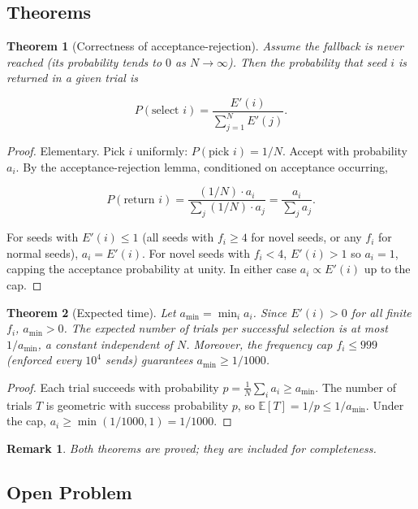 \documentclass[11pt,a4paper]{article}
\newtheorem{theorem}{Theorem}
\newtheorem{remark}{Remark}
\begin{document}
\subsection{Theorems}

\begin{theorem}[Correctness of acceptance-rejection]
\label{thm:ifps-correct}
Assume the fallback is never reached (its probability tends to $0$ as
$N \to \infty$).  Then the probability that seed $i$ is returned in a
given trial is

\[
P(\text{select } i) = \frac{E'(i)}{\sum_{j=1}^N E'(j)}.
\]
\end{theorem}

\begin{proof}
Elementary.  Pick $i$ uniformly: $P(\text{pick } i) = 1/N$.  Accept with
probability $a_i$.  By the acceptance-rejection lemma, conditioned on
acceptance occurring,

\[
P(\text{return } i) = \frac{(1/N) \cdot a_i}{\sum_j (1/N) \cdot a_j}
= \frac{a_i}{\sum_j a_j}.
\]

For seeds with $E'(i) \le 1$ (all seeds with $f_i \ge 4$ for novel
seeds, or any $f_i$ for normal seeds), $a_i = E'(i)$.  For novel seeds
with $f_i < 4$, $E'(i) > 1$ so $a_i = 1$, capping the acceptance
probability at unity.  In either case $a_i \propto E'(i)$ up to the cap.
\end{proof}

\begin{theorem}[Expected time]
\label{thm:ifps-time}
Let $a_{\min} = \min_i a_i$.  Since $E'(i) > 0$ for all finite $f_i$,
$a_{\min} > 0$.  The expected number of trials per successful selection
is at most $1 / a_{\min}$, a constant independent of $N$.  Moreover, the
frequency cap $f_i \le 999$ (enforced every $10^4$ sends) guarantees
$a_{\min} \ge 1/1000$.
\end{theorem}

\begin{proof}
Each trial succeeds with probability $p = \frac{1}{N} \sum_i a_i \ge a_{\min}$.
The number of trials $T$ is geometric with success probability $p$,
so $\mathbb{E}[T] = 1/p \le 1/a_{\min}$.  Under the cap,
$a_i \ge \min(1/1000, 1) = 1/1000$.
\end{proof}

\begin{remark}
Both theorems are proved; they are included for completeness.
\end{remark}

\subsection{Open Problem}
\end{document}
